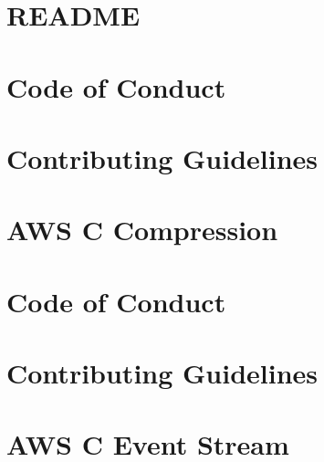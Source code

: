 \documentclass[twoside]{book}
\newcommand{\+}{\discretionary{\mbox{\scriptsize$\hookleftarrow$}}{}{}}
\begin{document}
\chapter{README}
\label{md_crt_aws_crt_cpp_crt_aws_c_common_verification_cbmc_templates_training_material__r_e_a_d_m_e}

\chapter{Code of Conduct}
\label{md_crt_aws_crt_cpp_crt_aws_c_compression__c_o_d_e__o_f__c_o_n_d_u_c_t}

\chapter{Contributing Guidelines}
\label{md_crt_aws_crt_cpp_crt_aws_c_compression__c_o_n_t_r_i_b_u_t_i_n_g}

\chapter{AWS C Compression}
\label{md_crt_aws_crt_cpp_crt_aws_c_compression__r_e_a_d_m_e}

\chapter{Code of Conduct}
\label{md_crt_aws_crt_cpp_crt_aws_c_event_stream__c_o_d_e__o_f__c_o_n_d_u_c_t}

\chapter{Contributing Guidelines}
\label{md_crt_aws_crt_cpp_crt_aws_c_event_stream__c_o_n_t_r_i_b_u_t_i_n_g}

\chapter{AWS C Event Stream}
\label{md_crt_aws_crt_cpp_crt_aws_c_event_stream__r_e_a_d_m_e}

\end{document}
